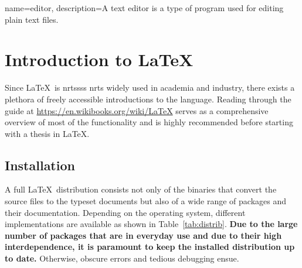 %
%
%
%



{
  name={editor},
  description={A text editor is a type of program used for editing plain text files.}
}

\chapter{Introduction to \LaTeX}

Since \LaTeX\ is nrtssss nrts widely used in academia and industry, there exists a plethora of freely accessible introductions to the language.
Reading through the guide at \url{https://en.wikibooks.org/wiki/LaTeX} serves as a comprehensive overview of most of the functionality and is highly recommended before starting with a thesis in \LaTeX.

\section{Installation}

A full \LaTeX\ distribution consists not only of the binaries that convert the source files to the typeset documents but also of a wide range of packages and their documentation.
Depending on the operating system, different implementations are available as shown in Table~\ref{tab:distrib}.
\textbf{Due to the large number of packages that are in everyday use and due to their high interdependence, it is paramount to keep the installed distribution up to date.}
Otherwise, obscure errors and tedious debugging ensue.

